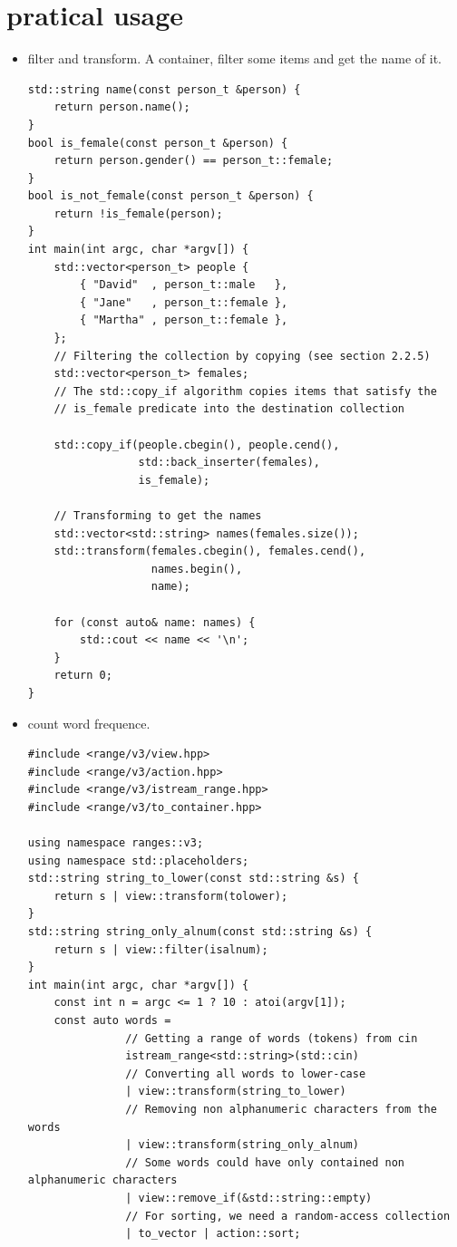 \documentclass[a4paper,11pt,twoside]{book}
\begin{document}
\section{pratical usage}
\begin{itemize}
\item filter and transform. A container, filter some items and get the name of it.
\begin{lstlisting}
std::string name(const person_t &person) {
    return person.name();
}
bool is_female(const person_t &person) {
    return person.gender() == person_t::female;
}
bool is_not_female(const person_t &person) {
    return !is_female(person);
}
int main(int argc, char *argv[]) {
    std::vector<person_t> people {
        { "David"  , person_t::male   },
        { "Jane"   , person_t::female },
        { "Martha" , person_t::female },
    };
    // Filtering the collection by copying (see section 2.2.5)
    std::vector<person_t> females;
    // The std::copy_if algorithm copies items that satisfy the
    // is_female predicate into the destination collection

    std::copy_if(people.cbegin(), people.cend(),
                 std::back_inserter(females),
                 is_female);

    // Transforming to get the names
    std::vector<std::string> names(females.size());
    std::transform(females.cbegin(), females.cend(),
                   names.begin(),
                   name);

    for (const auto& name: names) {
        std::cout << name << '\n';
    }
    return 0;
}
\end{lstlisting}

\item count word frequence. 
\begin{lstlisting}
#include <range/v3/view.hpp>
#include <range/v3/action.hpp>
#include <range/v3/istream_range.hpp>
#include <range/v3/to_container.hpp>

using namespace ranges::v3;
using namespace std::placeholders;
std::string string_to_lower(const std::string &s) {
    return s | view::transform(tolower);
}
std::string string_only_alnum(const std::string &s) {
    return s | view::filter(isalnum);
}
int main(int argc, char *argv[]) {
    const int n = argc <= 1 ? 10 : atoi(argv[1]);
    const auto words =
               // Getting a range of words (tokens) from cin
               istream_range<std::string>(std::cin)
               // Converting all words to lower-case
               | view::transform(string_to_lower)
               // Removing non alphanumeric characters from the words
               | view::transform(string_only_alnum)
               // Some words could have only contained non alphanumeric characters
               | view::remove_if(&std::string::empty)
               // For sorting, we need a random-access collection
               | to_vector | action::sort;


\end{lstlisting}
\end{itemize}
\end{document}
